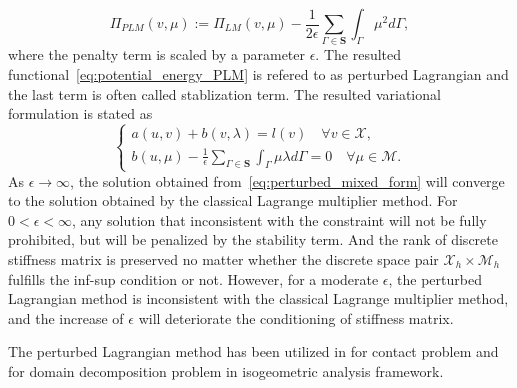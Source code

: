 \documentclass[preprint,12pt]{elsarticle}
\theoremstyle{remark}
\begin{document}
\begin{equation}
    \Pi_{PLM}(v,\mu):=\Pi_{LM}(v,\mu)-\frac{1}{2\epsilon}\sum_{\Gamma\in\mathbf{S}}\int_\Gamma\mu^2d\Gamma,\label{eq:potential_energy_PLM}
\end{equation}
where the penalty term is scaled by a parameter $\epsilon$. The resulted functional~\eqref{eq:potential_energy_PLM} is refered to as perturbed Lagrangian and the last term is often called stablization term. The resulted variational formulation is stated as
\begin{equation}
    \left\{
    \begin{array}{ll}
        a(u,v)+b(v,\lambda)=l(v) \quad \forall v\in{\mathcal{X}},\\
        b(u,\mu) - \frac{1}{\epsilon}\sum_{\Gamma\in\mathbf{S}}\int_\Gamma\mu\lambda{}d\Gamma=0 \quad \forall \mu\in{\mathcal{M}}.\label{eq:perturbed_mixed_form}
    \end{array}
    \right.
\end{equation}
As $\epsilon\rightarrow\infty$, the solution obtained from~\eqref{eq:perturbed_mixed_form} will converge to the solution obtained by the classical Lagrange multiplier method. For $0<\epsilon<{\infty}$, any solution that inconsistent with the constraint will not be fully prohibited, but will be penalized by the stability term. And the rank of discrete stiffness matrix is preserved no matter whether the discrete space pair $\mathcal{X}_h\times{}\mathcal{M}_h$ fulfills the inf-sup condition or not. However, for a moderate $\epsilon$, the perturbed Lagrangian method is inconsistent with the classical Lagrange multiplier method, and the increase of $\epsilon$ will deteriorate the conditioning of stiffness matrix.\par

The perturbed Lagrangian method has been utilized in \cite{simo1985perturbed} for contact problem and \cite{dornisch2011boundary, apostolatos2015domain} for domain decomposition problem in isogeometric analysis framework.
\end{document}

